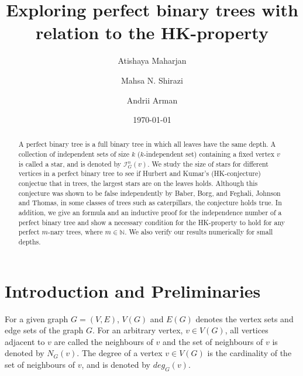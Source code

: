 \documentclass[10pt]{amsart}
\title[]{Exploring perfect binary trees with relation to the HK-property}
\author[Atishaya Maharjan]{Atishaya Maharjan} \email[Atishaya Maharjan]{maharjaa@myumanitoba.ca}
\author[M.~N.~Shirazi]{Mahsa N. Shirazi} \email[M.~N.~Shirazi]{mahsa.nasrollahi@gmail.com}
\author[Andrii Arman]{Andrii Arman} \email[Andrii Arman]{andrii.arman@umanitoba.ca}
\date{\today}
\theoremstyle{definition}
\begin{document}
\begin{abstract}
	A perfect binary tree is a full binary tree in which all leaves have the same depth. A collection of independent sets of size $k$ ($k$-independent set) containing a fixed vertex $v$ is called a star, and is denoted by $\mathcal{I}^n_G(v)$. We study the size of stars for different vertices in a perfect binary tree to see if Hurbert and Kumar's (HK-conjecture) conjectue that in trees, the largest stars are on the leaves holds. Although this conjecture was shown to be false independently by Baber, Borg, and Feghali, Johnson and Thomas, in some classes of trees such as caterpillars, the conjecture holds true. In addition, we give an formula and an inductive proof for the independence number of a perfect binary tree and show a necessary condition for the HK-property to hold for any perfect $m$-nary trees, where $m \in \mathbb{N}$. We also verify our results numerically for small depths.
\end{abstract}

\maketitle

\section{Introduction and Preliminaries}
For a given graph $G = (V,E)$, $V(G)$ and $E(G)$ denotes the vertex sets and edge sets of the graph $G$. For an arbitrary vertex, $v \in V(G)$, all vertices adjacent to $v$ are called the neighbours of $v$ and the set of neighbours of $v$ is denoted by $N_G(v)$. The degree of a vertex $v \in V(G)$ is the cardinality of the set of neighbours of $v$, and is denoted by $deg_G(v)$.

\end{document}
